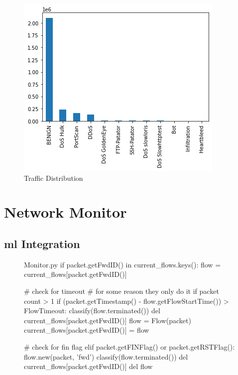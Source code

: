 \begin{figure}[h!]
    \centering
    \includegraphics[scale=0.6]{assets/figures/chapter3/traffic_distribution.png}
    \caption{Traffic Distribution}
    \label{fig:traffic-distribution}
\end{figure}


\section{Network Monitor}
\label{sec:monitor-implementation}

\textcolor{dimgray}{\lipsum[1]}


\subsection{\gls{ml} Integration}
\label{subsec:ml-integration}

\textcolor{dimgray}{\lipsum[1]}

\begin{figure}
    \begin{code}[colback=white]{Monitor.py}
if packet.getFwdID() in current_flows.keys():
flow = current_flows[packet.getFwdID()]

# check for timeout
# for some reason they only do it if packet count > 1
if (packet.getTimestamp() - flow.getFlowStartTime()) > FlowTimeout:
    classify(flow.terminated())
    del current_flows[packet.getFwdID()]
    flow = Flow(packet)
    current_flows[packet.getFwdID()] = flow

# check for fin flag
elif packet.getFINFlag() or packet.getRSTFlag():
    flow.new(packet, 'fwd')
    classify(flow.terminated())
    del current_flows[packet.getFwdID()]
    del flow
\end{code}
\end{figure}

